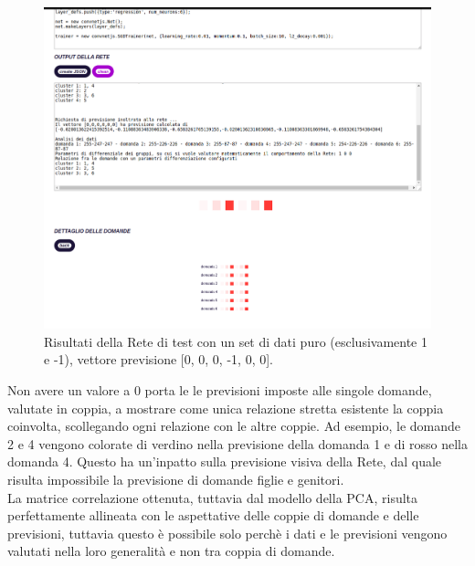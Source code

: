 \begin{figure}[H]
\centering
	\includegraphics[width=1\linewidth]{./image/RetediProva_generatorinputpuro.png}
	\caption{Risultati della Rete di test con un set di dati puro (esclusivamente 1 e -1), vettore previsione [0, 0, 0, -1, 0, 0].}
	\label{Risultati della Rete di test con un set di dati puro (esclusivamente 1 e -1), vettore previsione [0, 0, 0, -1, 0, 0].}
\end{figure}
\noindent
Non avere un valore a 0 porta le le previsioni imposte alle singole domande, valutate in coppia, a mostrare come unica relazione stretta esistente la coppia coinvolta, scollegando ogni relazione con le altre coppie. Ad esempio, le domande 2 e 4 vengono colorate di verdino nella previsione della domanda 1 e di rosso nella domanda 4. Questo ha un'inpatto sulla previsione visiva della Rete, dal quale risulta impossibile la previsione di domande figlie e genitori.\\
La matrice correlazione ottenuta, tuttavia dal modello della PCA, risulta perfettamente allineata con le aspettative delle coppie di domande e delle previsioni, tuttavia questo \`e possibile solo perch\`e i dati e le previsioni vengono valutati nella loro generalit\`a e non tra coppia di domande.


